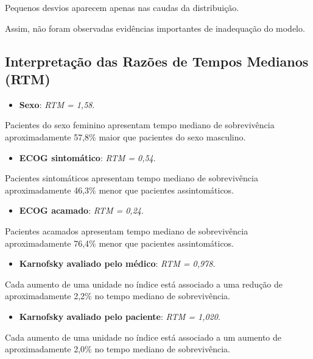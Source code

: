 \documentclass[
  brazilian,
  letterpaper,
  DIV=11,
  numbers=noendperiod]{scrartcl}
\providecommand{\tightlist}{%
  \setlength{\itemsep}{0pt}\setlength{\parskip}{0pt}}
\begin{document}
Pequenos desvios aparecem apenas nas caudas da distribuição.

Assim, não foram observadas evidências importantes de inadequação do
modelo.

\subsection{\texorpdfstring{\textbf{Interpretação das Razões de Tempos
Medianos
(RTM)}}{Interpretação das Razões de Tempos Medianos (RTM)}}\label{interpretauxe7uxe3o-das-razuxf5es-de-tempos-medianos-rtm}

\begin{itemize}
\tightlist
\item
  \textbf{Sexo}: \emph{RTM = 1,58}.
\end{itemize}

Pacientes do sexo feminino apresentam tempo mediano de sobrevivência
aproximadamente 57,8\% maior que pacientes do sexo masculino.

\begin{itemize}
\tightlist
\item
  \textbf{ECOG sintomático}: \emph{RTM = 0,54}.
\end{itemize}

Pacientes sintomáticos apresentam tempo mediano de sobrevivência
aproximadamente 46,3\% menor que pacientes assintomáticos.

\begin{itemize}
\tightlist
\item
  \textbf{ECOG acamado}: \emph{RTM = 0,24}.
\end{itemize}

Pacientes acamados apresentam tempo mediano de sobrevivência
aproximadamente 76,4\% menor que pacientes assintomáticos.

\begin{itemize}
\tightlist
\item
  \textbf{Karnofsky avaliado pelo médico}: \emph{RTM = 0,978}.
\end{itemize}

Cada aumento de uma unidade no índice está associado a uma redução de
aproximadamente 2,2\% no tempo mediano de sobrevivência.

\begin{itemize}
\tightlist
\item
  \textbf{Karnofsky avaliado pelo paciente}: \emph{RTM = 1,020}.
\end{itemize}

Cada aumento de uma unidade no índice está associado a um aumento de
aproximadamente 2,0\% no tempo mediano de sobrevivência.
\end{document}

